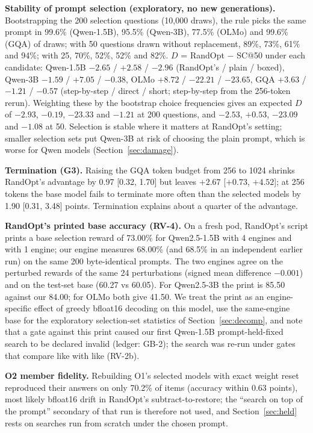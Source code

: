 \documentclass{article}
\begin{document}
\textbf{Stability of prompt selection (exploratory, no new generations).} Bootstrapping the 200 selection questions
(10,000 draws), the rule picks the same prompt in 99.6\% (Qwen-1.5B), 95.5\% (Qwen-3B), 77.5\% (OLMo) and 99.6\% (GQA)
of draws; with 50 questions drawn without replacement, 89\%, 73\%, 61\% and 94\%; with 25, 70\%, 52\%, 52\% and 82\%.
$D$ = RandOpt $-$ SC@50 under each candidate: Qwen-1.5B $-2.65$ / $+2.58$ / $-2.96$ (RandOpt's / plain / boxed),
Qwen-3B $-1.59$ / $+7.05$ / $-0.38$, OLMo $+8.72$ / $-22.21$ / $-23.65$, GQA $+3.63$ / $-1.21$ / $-0.57$ (step-by-step /
direct / short; step-by-step from the 256-token rerun). Weighting these by the bootstrap choice frequencies gives an
expected $D$ of $-2.93$, $-0.19$, $-23.33$ and $-1.21$ at 200 questions, and $-2.53$, $+0.53$, $-23.09$ and $-1.08$ at
50. Selection is stable where it matters at RandOpt's setting; smaller selection sets put Qwen-3B at risk of choosing
the plain prompt, which is worse for Qwen models (Section~\ref{sec:damage}).

\textbf{Termination (G3).} Raising the GQA token budget from 256 to 1024 shrinks RandOpt's advantage by 0.97 [0.32,
1.70] but leaves $+2.67$ [$+0.73$, $+4.52$]; at 256 tokens the base model fails to terminate more often than the
selected models by 1.90 [0.31, 3.48] points. Termination explains about a quarter of the advantage.

\textbf{RandOpt's printed base accuracy (RV-4).} On a fresh pod, RandOpt's script prints a base selection reward of
73.00\% for Qwen2.5-1.5B with 4 engines and with 1 engine; our engine measures 68.00\% (and 68.5\% in an independent
earlier run) on the same 200 byte-identical prompts. The two engines agree on the perturbed rewards of the same 24
perturbations (signed mean difference $-0.001$) and on the test-set base (60.27 vs 60.05). For Qwen2.5-3B the print is
85.50 against our 84.00; for OLMo both give 41.50. We treat the print as an engine-specific effect of greedy
bfloat16 decoding on this model, use the same-engine base for the exploratory selection-set statistics of
Section~\ref{sec:decomp}, and note that a gate against this print caused our first Qwen-1.5B prompt-held-fixed search
to be declared invalid (ledger: GB-2); the search was re-run under gates that compare like with like (RV-2b).

\textbf{O2 member fidelity.} Rebuilding O1's selected models with exact weight reset reproduced their answers on only
70.2\% of items (accuracy within 0.63 points), most likely bfloat16 drift in RandOpt's subtract-to-restore; the
``search on top of the prompt'' secondary of that run is therefore not used, and Section~\ref{sec:held} rests on
searches run from scratch under the chosen prompt.
\end{document}

